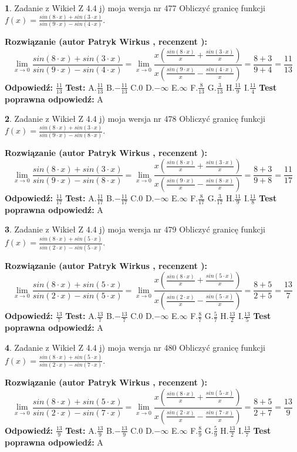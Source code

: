 \documentclass[12pt, a4paper]{article}
\theoremstyle{definition} %
\newtheorem{zad}{}
\newcommand{\zadStart}[1]{\begin{zad}#1\newline}
\newcommand{\zadStop}{\end{zad}}
\newcommand{\rozwStart}[2]{\noindent \textbf{Rozwiązanie (autor #1 , recenzent #2): }\newline}
\newcommand{\rozwStop}{\newline}
\newcommand{\odpStart}{\noindent \textbf{Odpowiedź:}\newline}
\newcommand{\odpStop}{\newline}
\newcommand{\testStart}{\noindent \textbf{Test:}\newline}
\newcommand{\testStop}{\newline}
\newcommand{\kluczStart}{\noindent \textbf{Test poprawna odpowiedź:}\newline}
\newcommand{\kluczStop}{\newline}
\begin{document}
\zadStart{Zadanie z Wikieł Z 4.4 j) moja wersja nr 477}
Obliczyć granicę funkcji $f(x)=\frac{sin(8\cdot x) +sin(3\cdot x)}{sin(9\cdot x) -sin(4\cdot x)}$.
\zadStop
\rozwStart{Patryk Wirkus}{}
$$\lim\limits_{x\to 0}\frac{sin(8\cdot x) +sin(3\cdot x)}{sin(9\cdot x) -sin(4\cdot x)}=\lim\limits_{x\to 0}\frac{x(\frac{sin(8\cdot x)}{x}+\frac{sin(3\cdot x)}{x})}{x(\frac{sin(9\cdot x)}{x}-\frac{sin(4\cdot x)}{x})}=\frac{8+3}{9+4} = \frac{11}{13}$$
\rozwStop
\odpStart
$\frac{11}{13}$
\odpStop
\testStart
A.$\frac{11}{13}$
B.$-\frac{11}{13}$
C.$0$
D.$-\infty$
E.$\infty$
F.$\frac{8}{13}$
G.$\frac{3}{13}$
H.$\frac{11}{9}$
I.$\frac{11}{4}$
\testStop
\kluczStart
A
\kluczStop



\zadStart{Zadanie z Wikieł Z 4.4 j) moja wersja nr 478}
Obliczyć granicę funkcji $f(x)=\frac{sin(8\cdot x) +sin(3\cdot x)}{sin(9\cdot x) -sin(8\cdot x)}$.
\zadStop
\rozwStart{Patryk Wirkus}{}
$$\lim\limits_{x\to 0}\frac{sin(8\cdot x) +sin(3\cdot x)}{sin(9\cdot x) -sin(8\cdot x)}=\lim\limits_{x\to 0}\frac{x(\frac{sin(8\cdot x)}{x}+\frac{sin(3\cdot x)}{x})}{x(\frac{sin(9\cdot x)}{x}-\frac{sin(8\cdot x)}{x})}=\frac{8+3}{9+8} = \frac{11}{17}$$
\rozwStop
\odpStart
$\frac{11}{17}$
\odpStop
\testStart
A.$\frac{11}{17}$
B.$-\frac{11}{17}$
C.$0$
D.$-\infty$
E.$\infty$
F.$\frac{8}{17}$
G.$\frac{3}{17}$
H.$\frac{11}{9}$
I.$\frac{11}{8}$
\testStop
\kluczStart
A
\kluczStop



\zadStart{Zadanie z Wikieł Z 4.4 j) moja wersja nr 479}
Obliczyć granicę funkcji $f(x)=\frac{sin(8\cdot x) +sin(5\cdot x)}{sin(2\cdot x) -sin(5\cdot x)}$.
\zadStop
\rozwStart{Patryk Wirkus}{}
$$\lim\limits_{x\to 0}\frac{sin(8\cdot x) +sin(5\cdot x)}{sin(2\cdot x) -sin(5\cdot x)}=\lim\limits_{x\to 0}\frac{x(\frac{sin(8\cdot x)}{x}+\frac{sin(5\cdot x)}{x})}{x(\frac{sin(2\cdot x)}{x}-\frac{sin(5\cdot x)}{x})}=\frac{8+5}{2+5} = \frac{13}{7}$$
\rozwStop
\odpStart
$\frac{13}{7}$
\odpStop
\testStart
A.$\frac{13}{7}$
B.$-\frac{13}{7}$
C.$0$
D.$-\infty$
E.$\infty$
F.$\frac{8}{7}$
G.$\frac{5}{7}$
H.$\frac{13}{2}$
I.$\frac{13}{5}$
\testStop
\kluczStart
A
\kluczStop



\zadStart{Zadanie z Wikieł Z 4.4 j) moja wersja nr 480}
Obliczyć granicę funkcji $f(x)=\frac{sin(8\cdot x) +sin(5\cdot x)}{sin(2\cdot x) -sin(7\cdot x)}$.
\zadStop
\rozwStart{Patryk Wirkus}{}
$$\lim\limits_{x\to 0}\frac{sin(8\cdot x) +sin(5\cdot x)}{sin(2\cdot x) -sin(7\cdot x)}=\lim\limits_{x\to 0}\frac{x(\frac{sin(8\cdot x)}{x}+\frac{sin(5\cdot x)}{x})}{x(\frac{sin(2\cdot x)}{x}-\frac{sin(7\cdot x)}{x})}=\frac{8+5}{2+7} = \frac{13}{9}$$
\rozwStop
\odpStart
$\frac{13}{9}$
\odpStop
\testStart
A.$\frac{13}{9}$
B.$-\frac{13}{9}$
C.$0$
D.$-\infty$
E.$\infty$
F.$\frac{8}{9}$
G.$\frac{5}{9}$
H.$\frac{13}{2}$
I.$\frac{13}{7}$
\testStop
\kluczStart
A
\kluczStop
\end{document}
